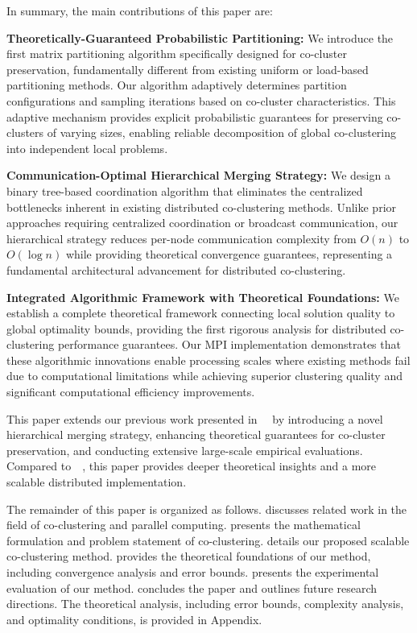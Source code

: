 \documentclass[journal]{IEEEtran}
\theoremstyle{definition}
\theoremstyle{remark} %
\renewcommand{\cite}[1]{~\autocite{#1}}
\begin{document}
In summary, the main contributions of this paper are:
\begin{enumerate}
    {\color{blue}
    \item \textbf{Theoretically-Guaranteed Probabilistic Partitioning:} We introduce the first matrix partitioning algorithm specifically designed for co-cluster preservation, fundamentally different from existing uniform or load-based partitioning methods. Our algorithm adaptively determines partition configurations and sampling iterations based on co-cluster characteristics. This adaptive mechanism provides explicit probabilistic guarantees for preserving co-clusters of varying sizes, enabling reliable decomposition of global co-clustering into independent local problems.
          }

    \item \textbf{Communication-Optimal Hierarchical Merging Strategy:} We design a binary tree-based coordination algorithm that eliminates the centralized bottlenecks inherent in existing distributed co-clustering methods. Unlike prior approaches requiring centralized coordination or broadcast communication, our hierarchical strategy reduces per-node communication complexity from $O(n)$ to $O(\log n)$ while providing theoretical convergence guarantees, representing a fundamental architectural advancement for distributed co-clustering.

    \item \textbf{Integrated Algorithmic Framework with Theoretical Foundations:} We establish a complete theoretical framework connecting local solution quality to global optimality bounds, providing the first rigorous analysis for distributed co-clustering performance guarantees. Our MPI implementation demonstrates that these algorithmic innovations enable processing scales where existing methods fail due to computational limitations while achieving superior clustering quality and significant computational efficiency improvements.
\end{enumerate}

This paper extends our previous work presented in~\cite{wu2024ScalableCoClusteringLargeScale} by introducing a novel hierarchical merging strategy, enhancing theoretical guarantees for co-cluster preservation, and conducting extensive large-scale empirical evaluations. Compared to~\cite{wu2024ScalableCoClusteringLargeScale}, this paper provides deeper theoretical insights and a more scalable distributed implementation.

The remainder of this paper is organized as follows.  discusses related work in the field of co-clustering and parallel computing.  presents the mathematical formulation and problem statement of co-clustering.  details our proposed scalable co-clustering method.  provides the theoretical foundations of our method, including convergence analysis and error bounds.  presents the experimental evaluation of our method.  concludes the paper and outlines future research directions. The theoretical analysis, including error bounds, complexity analysis, and optimality conditions, is provided in Appendix.
\end{document}
